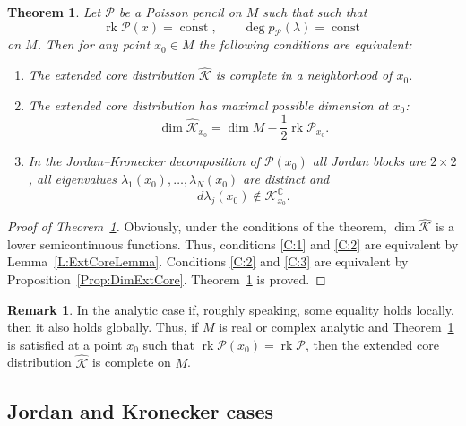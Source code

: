 \documentclass[12pt]{article}
\newtheorem{theorem}[lemma]{Theorem}
\theoremstyle{definition}
\newtheorem{remark}[lemma]{Remark}
\begin{document}
\begin{theorem} \label{Th:CompCrit} Let $\mathcal{P}$ be a Poisson pencil on $M$ such that such that \[ \operatorname{rk} \mathcal{P}(x) = \operatorname{const}, \qquad \deg p_{\mathcal{P}}(\lambda) = \operatorname{const} \] on $M$. Then for any point $x_0 \in M$ the following conditions are equivalent:

\begin{enumerate}

\item \label{C:1} The extended core distribution $\hat{\mathcal{K}}$ is complete in a neighborhood of $x_0$.


\item \label{C:2}  The extended core distribution has maximal possible dimension at $x_0$: \begin{equation} \label{Eq:DimExtPointCrit} \dim \hat{\mathcal{K}}_{x_0} = \dim M - \frac{1}{2} \operatorname{rk} \mathcal{P}_{x_0}.\end{equation}

\item \label{C:3}  In the Jordan--Kronecker decomposition of $\mathcal{P}(x_0)$
all Jordan blocks are $2 \times 2$, all  eigenvalues $\lambda_1(x_0), \dots, \lambda_{N}(x_0)$ are distinct and \[ d \lambda_j (x_0) \not \in \mathcal{K}^{\mathbb{C}}_{x_0}.\] 
\end{enumerate}
    
\end{theorem}

\begin{proof}[Proof of Theorem~\ref{Th:CompCrit}] Obviously, under the conditions of the theorem, $\dim \hat{\mathcal{K}}$ is a  lower semicontinuous  functions. Thus, conditions \ref{C:1} and \ref{C:2} are equivalent by  Lemma~\ref{L:ExtCoreLemma}. Conditions \ref{C:2} and \ref{C:3}  are equivalent by Proposition~\ref{Prop:DimExtCore}. Theorem~\ref{Th:CompCrit}  is proved. \end{proof}


\begin{remark} In the analytic case if, roughly speaking, some equality holds locally, then it also holds globally. Thus, if $M$ is real or complex analytic and Theorem~\ref{Th:CompCrit} is satisfied at a point $x_0$ such that $\operatorname{rk}\mathcal{P}(x_0) = \operatorname{rk} \mathcal{P}$, then the extended core distribution $\hat{\mathcal{K}}$ is complete on $M$.
\end{remark}


\subsection{Jordan and Kronecker cases}
\end{document}
